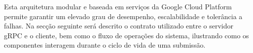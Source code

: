Esta arquitetura modular e baseada em serviços da Google Cloud Platform permite
garantir um elevado grau de desempenho, escalabilidade e tolerância a falhas.
Na secção seguinte será descrito o contrato utilizado entre o servidor gRPC e o
cliente, bem como o fluxo de operações do sistema, ilustrando como os
componentes interagem durante o ciclo de vida de uma submissão.

